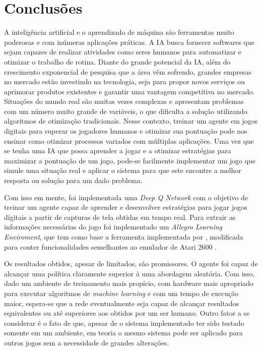 \chapter{Conclusões}
\label{chap:conclusoes}

A inteligência artificial e o aprendizado de máquina são ferramentas muito poderosas e com inúmeras aplicações práticas. A IA busca fornecer softwares que sejam capazes de realizar atividades como seres humanos para automatizar e otimizar o trabalho de rotina. Diante do grande potencial da IA, além do crescimento exponencial de pesquisa que a área vêm sofrendo, grandes empresas no mercado estão investindo na tecnologia, seja para propor novos serviços ou aprimorar produtos existentes e garantir uma vantagem competitiva no mercado.
Situações do mundo real são muitas vezes complexas e apresentam problemas com um número muito grande de variáveis, o que dificulta a solução utilizando algoritmos de otimização tradicionais. Nesse contexto, treinar um agente em jogos digitais para superar os jogadores humanos e otimizar sua pontuação pode nos ensinar como otimizar processos variados com múltiplas aplicações. Uma vez que se tenha uma IA que possa aprender a jogar e a otimizar estratégias para maximizar a pontuação de um jogo, pode-se facilmente implementar um jogo que simule uma situação real e aplicar o sistema para que este encontre a melhor resposta ou solução para um dado problema. 

Com isso em mente, foi implementada uma \textit{Deep Q Network} com o objetivo de treinar um agente capaz de aprender e desenvolver estratégias para jogar jogos digitais a partir de capturas de tela obtidas em tempo real. Para extrair as informações necessárias do jogo foi implementado um \textit{Allegro Learning Enviroment}, que tem como base a ferramenta implementada por \cite{silva:amb-jd-allegro}, modificada para conter funcionalidades semelhantes ao emulador de Atari 2600 \cite{brockman2016openai}.

Os resultados obtidos, apesar de limitados, são promissores. O agente foi capaz de alcançar uma política claramente superior à uma abordagem aleatória. Com isso, dado um ambiente de treinamento mais propício, com hardware mais apropriado para executar algoritmos de \textit{machine learning} e com um tempo de execução maior, espera-se que a rede eventualmente seja capaz de alcançar resultados equivalentes ou até superiores aos obtidos por um ser humano. Outro fator a se considerar é o fato de que, apesar de o sistema implementado ter sido testado somente em um ambiente, em teoria o mesmo sistema pode ser aplicado para outros jogos sem a necessidade de grandes alterações. 

